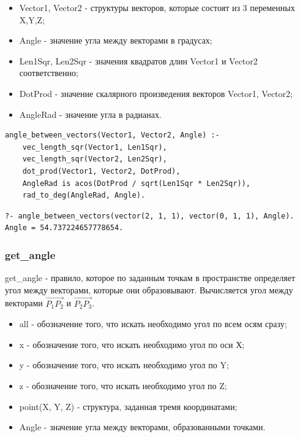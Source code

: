 \begin{itemize}
	\item Vector1, Vector2 - структуры векторов, которые состоят из 3 переменных X,Y,Z;
	\item Angle - значение угла между векторами в градусах;
	\item Len1Sqr, Len2Sqr - значения квадратов длин Vector1 и Vector2 соответственно;
	\item DotProd - значение скалярного произведения векторов Vector1, Vector2;
	\item AngleRad - значение угла в радианах.
\end{itemize}

\begin{lstlisting}[caption=Реализация правила angle\_between\_vectors, label=rules:anglebetweenvectors]
angle_between_vectors(Vector1, Vector2, Angle) :-
	vec_length_sqr(Vector1, Len1Sqr),
	vec_length_sqr(Vector2, Len2Sqr),
	dot_prod(Vector1, Vector2, DotProd),
	AngleRad is acos(DotProd / sqrt(Len1Sqr * Len2Sqr)),
	rad_to_deg(AngleRad, Angle).
\end{lstlisting}

\begin{lstlisting}[caption=Пример использования правила angle\_between\_vectors, label=example:anglebetweenvectors]
?- angle_between_vectors(vector(2, 1, 1), vector(0, 1, 1), Angle).
Angle = 54.737224657778654.
\end{lstlisting}

\subsubsection{get\_angle}
\hspace{0.6cm} get\_angle - правило, которое по заданным точкам в пространстве определяет угол между векторами, которые они образовывают. Вычисляется угол между векторами $\vec{P_1 P_2}$ и $\vec{P_2 P_3}$.

\begin{itemize}
	\item all - обозначение того, что искать необходимо угол по всем осям сразу;
	\item x - обозначение того, что искать необходимо угол по оси Х;
	\item y - обозначение того, что искать необходимо угол по Y;
	\item z - обозначение того, что искать необходимо угол по Z;
	\item point(X, Y, Z) - структура, заданная тремя координатами;
	\item Angle - значение угла между векторами, образованными точками.
\end{itemize}

